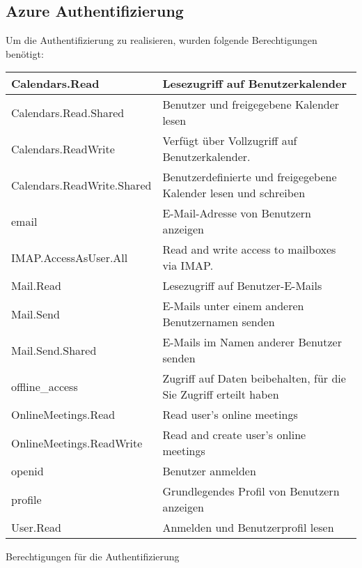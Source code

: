 \subsection{Azure Authentifizierung}\label{subsec:Azure Authentifizierung}
Um die Authentifizierung zu realisieren, wurden folgende Berechtigungen benötigt:
\newline
\newline
    \centering
\small
    \begin{tabularx}{\textwidth}{|X|X|}
        \toprule
        \textbf{Calendars.Read} & \textbf{Lesezugriff auf Benutzerkalender}\\
        \hline
        Calendars.Read.Shared  & Benutzer und freigegebene Kalender lesen\\
        \hline
        Calendars.ReadWrite  & Verfügt über Vollzugriff auf Benutzerkalender.\\
        \hline
        Calendars.ReadWrite.Shared  & Benutzerdefinierte und freigegebene Kalender lesen und schreiben\\
        \hline
        email  & E-Mail-Adresse von Benutzern anzeigen \\
        \hline
        IMAP.AccessAsUser.All  & Read and write access to mailboxes via IMAP.\\
        \hline
        Mail.Read  & Lesezugriff auf Benutzer-E-Mails\\
        \hline
        Mail.Send  & E-Mails unter einem anderen Benutzernamen senden\\
        \hline
        Mail.Send.Shared  & E-Mails im Namen anderer Benutzer senden\\
        \hline
        offline\_access  & Zugriff auf Daten beibehalten, für die Sie Zugriff erteilt haben\\
        \hline
        OnlineMeetings.Read  & Read user's online meetings\\
        \hline
        OnlineMeetings.ReadWrite  & Read and create user's online meetings\\
        \hline
        openid  & Benutzer anmelden\\
        \hline
        profile  & Grundlegendes Profil von Benutzern anzeigen\\
        \hline
        User.Read  & Anmelden und Benutzerprofil lesen\\
        \bottomrule
    \end{tabularx}
    \caption{Berechtigungen für die Authentifizierung}\label{tab:Berechtigungen für die Authentifizierung}
